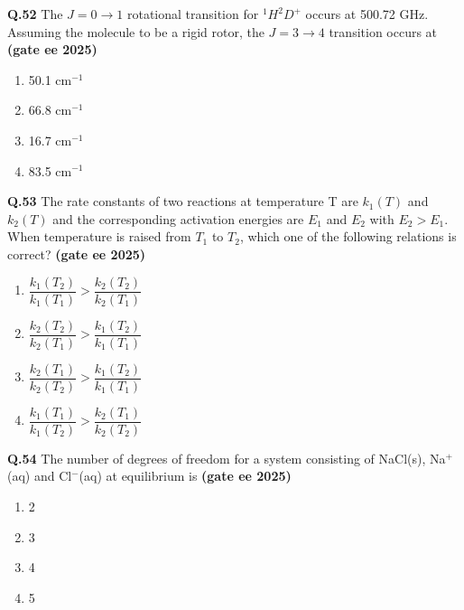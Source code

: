 \documentclass[journal,12pt,onecolumn]{exam}
\theoremstyle{remark}
\begin{document}
\noindent\textbf{Q.52} The $J = 0 \rightarrow 1$ rotational transition for $^{1}H^{2}D^{+}$ occurs at 500.72 GHz. Assuming the molecule to be a rigid rotor, the $J = 3 \rightarrow 4$ transition occurs at \hfill{\textbf{(gate ee 2025)}}
\begin{multicols}{2}
\begin{enumerate}[label=(\Alph*)]
    \item 50.1 cm$^{-1}$
    \item 66.8 cm$^{-1}$
    \item 16.7 cm$^{-1}$
    \item 83.5 cm$^{-1}$
\end{enumerate}
\end{multicols}
\vspace{3 cm}

\noindent\textbf{Q.53} The rate constants of two reactions at temperature T are $k_1(T)$ and $k_2(T)$ and the corresponding activation energies are $E_1$ and $E_2$ with $E_2 > E_1$. When temperature is raised from $T_1$ to $T_2$, which one of the following relations is correct? \hfill{\textbf{(gate ee 2025)}}
\begin{multicols}{2}
\begin{enumerate}[label=(\Alph*)]
    \item $\dfrac{k_1(T_2)}{k_1(T_1)} > \dfrac{k_2(T_2)}{k_2(T_1)}$
    \item $\dfrac{k_2(T_2)}{k_2(T_1)} > \dfrac{k_1(T_2)}{k_1(T_1)}$
    \item $\dfrac{k_2(T_1)}{k_2(T_2)} > \dfrac{k_1(T_2)}{k_1(T_1)}$
    \item $\dfrac{k_1(T_1)}{k_1(T_2)} > \dfrac{k_2(T_1)}{k_2(T_2)}$
\end{enumerate}
\end{multicols}
\vspace{3 cm}
\noindent\textbf{Q.54} The number of degrees of freedom for a system consisting of NaCl(s), Na$^+$(aq) and Cl$^-$(aq) at equilibrium is \hfill{\textbf{(gate ee 2025)}}
\begin{multicols}{2}
\begin{enumerate}[label=(\Alph*)]
    \item 2
    \item 3
    \item 4
    \item 5
\end{enumerate}
\end{multicols} 
\vspace{2 cm}
\end{document}
